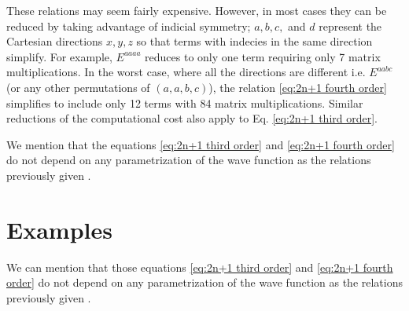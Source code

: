 \documentclass[prl,aps,letterpaper,twocolumn,showpacs,twocolumngrid,superbib]{revtex4}
\def\Tr{{\rm Tr}}
\def\F{\mathcal{F}}
\def\D{\mathcal{D}}
\begin{document}

These relations may seem fairly expensive. However, in most cases they
can be reduced by taking advantage of indicial symmetry; 
$a,b,c,$ and $d$ represent the Cartesian directions $x,y,z$
so that terms with indecies in the same direction simplify. For example,
$E^{aaaa}$ reduces to only one term requiring only 7 matrix multiplications.
In the worst case, where all the directions are different i.e. $E^{aabc}$ 
(or any other permutations of $(a,a,b,c)$), the relation \eqref{eq:2n+1 fourth order} 
simplifies to include only 12 terms with 84 matrix multiplications. 
Similar reductions of the computational cost also apply to 
Eq. \eqref{eq:2n+1 third order}.  

We mention that the equations 
\eqref{eq:2n+1 third order} and \eqref{eq:2n+1 fourth order}
do not depend on any parametrization of the wave function
as the relations previously given \cite{Helgaker_2001,Dupuis_1991}.

\section{Examples}




We can mention that those equations 
\eqref{eq:2n+1 third order} and \eqref{eq:2n+1 fourth order}
do not depend on any parametrization of the wave function
as the relations previously given \cite{Helgaker_2001,Dupuis_1991}.
\end{document}
